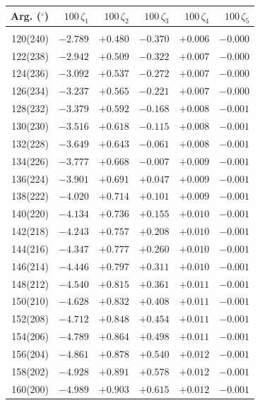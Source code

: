 \clearpage
\begin{table}[!h]\centering
\vspace{0.25cm}
\begin{tabular}{rrrrrr}
Arg. ($^\circ$) & $100\,\zeta_1$  & $100\,\zeta_2$ & $100\,\zeta_3$ & $100\,\zeta_4$  & $100\,\zeta_5$  \\\hline
&&&&&\\[-1.75ex]
  120(240) & $-2.789$ & $+0.480$ & $-0.370$ & $+0.006$ & $-0.000$\\
  122(238) & $-2.942$ & $+0.509$ & $-0.322$ & $+0.007$ & $-0.000$\\
  124(236) & $-3.092$ & $+0.537$ & $-0.272$ & $+0.007$ & $-0.000$\\
  126(234) & $-3.237$ & $+0.565$ & $-0.221$ & $+0.007$ & $-0.000$\\
128(232) & $-3.379$ & $+0.592$ & $-0.168$ & $+0.008$ & $-0.001$\\
130(230) & $-3.516$ & $+0.618$ & $-0.115$ & $+0.008$ & $-0.001$\\
132(228) & $-3.649$ & $+0.643$ & $-0.061$ & $+0.008$ & $-0.001$\\
134(226) & $-3.777$ & $+0.668$ & $-0.007$ & $+0.009$ & $-0.001$\\
136(224) & $-3.901$ & $+0.691$ & $+0.047$ & $+0.009$ & $-0.001$\\
138(222) & $-4.020$ & $+0.714$ & $+0.101$ & $+0.009$ & $-0.001$\\
 140(220) & $-4.134$ & $+0.736$ & $+0.155$ & $+0.010$ & $-0.001$\\
 142(218) & $-4.243$ & $+0.757$ & $+0.208$ & $+0.010$ & $-0.001$\\
 144(216) & $-4.347$ & $+0.777$ & $+0.260$ & $+0.010$ & $-0.001$\\
 146(214) & $-4.446$ & $+0.797$ & $+0.311$ & $+0.010$ & $-0.001$\\
 148(212) & $-4.540$ & $+0.815$ & $+0.361$ & $+0.011$ & $-0.001$\\
 150(210) & $-4.628$ & $+0.832$ & $+0.408$ & $+0.011$ & $-0.001$\\
 152(208) & $-4.712$ & $+0.848$ & $+0.454$ & $+0.011$ & $-0.001$\\
 154(206) & $-4.789$ & $+0.864$ & $+0.498$ & $+0.011$ & $-0.001$\\
 156(204) & $-4.861$ & $+0.878$ & $+0.540$ & $+0.012$ & $-0.001$\\
 158(202) & $-4.928$ & $+0.891$ & $+0.578$ & $+0.012$ & $-0.001$\\
  160(200) & $-4.989$ & $+0.903$ & $+0.615$ & $+0.012$ & $-0.001$\\

\end{tabular}
\end{table}
